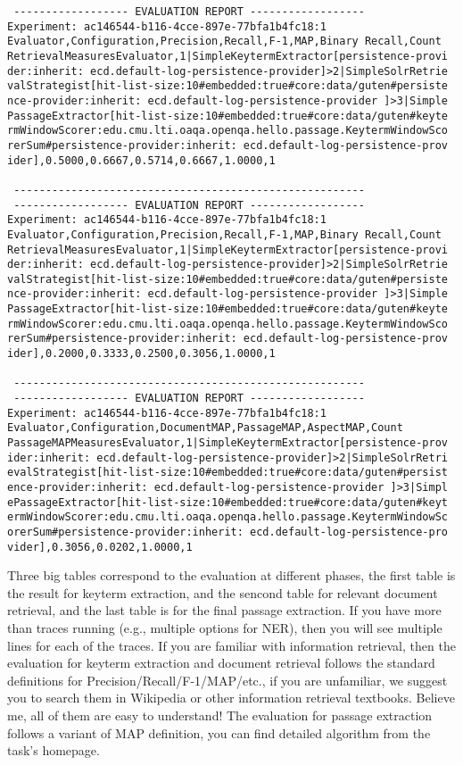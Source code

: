 \small
\begin{verbatim}
 ------------------ EVALUATION REPORT ------------------
Experiment: ac146544-b116-4cce-897e-77bfa1b4fc18:1
Evaluator,Configuration,Precision,Recall,F-1,MAP,Binary Recall,Count
RetrievalMeasuresEvaluator,1|SimpleKeytermExtractor[persistence-provi
der:inherit: ecd.default-log-persistence-provider]>2|SimpleSolrRetrie
valStrategist[hit-list-size:10#embedded:true#core:data/guten#persiste
nce-provider:inherit: ecd.default-log-persistence-provider ]>3|Simple
PassageExtractor[hit-list-size:10#embedded:true#core:data/guten#keyte
rmWindowScorer:edu.cmu.lti.oaqa.openqa.hello.passage.KeytermWindowSco
rerSum#persistence-provider:inherit: ecd.default-log-persistence-prov
ider],0.5000,0.6667,0.5714,0.6667,1.0000,1

 -------------------------------------------------------
 ------------------ EVALUATION REPORT ------------------
Experiment: ac146544-b116-4cce-897e-77bfa1b4fc18:1
Evaluator,Configuration,Precision,Recall,F-1,MAP,Binary Recall,Count
RetrievalMeasuresEvaluator,1|SimpleKeytermExtractor[persistence-provi
der:inherit: ecd.default-log-persistence-provider]>2|SimpleSolrRetrie
valStrategist[hit-list-size:10#embedded:true#core:data/guten#persiste
nce-provider:inherit: ecd.default-log-persistence-provider ]>3|Simple
PassageExtractor[hit-list-size:10#embedded:true#core:data/guten#keyte
rmWindowScorer:edu.cmu.lti.oaqa.openqa.hello.passage.KeytermWindowSco
rerSum#persistence-provider:inherit: ecd.default-log-persistence-prov
ider],0.2000,0.3333,0.2500,0.3056,1.0000,1

 -------------------------------------------------------
 ------------------ EVALUATION REPORT ------------------
Experiment: ac146544-b116-4cce-897e-77bfa1b4fc18:1
Evaluator,Configuration,DocumentMAP,PassageMAP,AspectMAP,Count
PassageMAPMeasuresEvaluator,1|SimpleKeytermExtractor[persistence-prov
ider:inherit: ecd.default-log-persistence-provider]>2|SimpleSolrRetri
evalStrategist[hit-list-size:10#embedded:true#core:data/guten#persist
ence-provider:inherit: ecd.default-log-persistence-provider ]>3|Simpl
ePassageExtractor[hit-list-size:10#embedded:true#core:data/guten#keyt
ermWindowScorer:edu.cmu.lti.oaqa.openqa.hello.passage.KeytermWindowSc
orerSum#persistence-provider:inherit: ecd.default-log-persistence-pro
vider],0.3056,0.0202,1.0000,1 
\end{verbatim}
\normalsize

Three big tables correspond to the evaluation at different phases, the first
table is the result for keyterm extraction, and the sencond table for relevant
document retrieval, and the last table is for the final passage extraction. If
you have more than traces running (e.g., multiple options for NER), then you
will see multiple lines for each of the traces. If you are familiar with
information retrieval, then the evaluation for keyterm extraction and document
retrieval follows the standard definitions for Precision/Recall/F-1/MAP/etc., if
you are unfamiliar, we suggest you to search them in Wikipedia or other
information retrieval textbooks. Believe me, all of them are easy to understand!
The evaluation for passage extraction follows a variant of MAP definition, you
can find detailed algorithm from the task's homepage.

